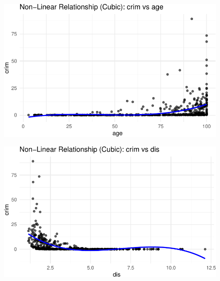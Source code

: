 \documentclass[
]{article}
\begin{document}
\begin{figure}[H]

{\centering \includegraphics{hw1_files/figure-pdf/unnamed-chunk-20-3.pdf}

}

\end{figure}

\begin{figure}[H]

{\centering \includegraphics{hw1_files/figure-pdf/unnamed-chunk-20-4.pdf}

}

\end{figure}
\end{document}
